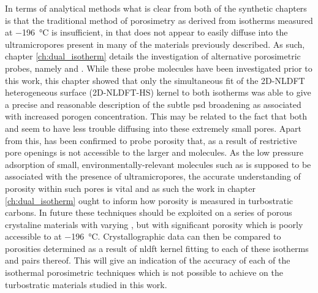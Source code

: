 In terms of analytical methods what is clear from both of the synthetic chapters is that the traditional method of porosimetry as derived from  isotherms measured at \qty{-196}{\degreeCelsius} is insufficient, in that  does not appear to easily diffuse into the \glspl{ultramicropore} present in many of the materials previously described. As such, chapter \ref{ch:dual_isotherm} details the investigation of alternative porosimetric probes, namely  and . While these probe molecules have been investigated prior to this work, this chapter showed that only the simultaneous fit of the 2D-NLDFT heterogeneous surface (2D-NLDFT-HS) kernel to both isotherms was able to give a precise and reasonable description of the subtle \acrshort{psd} broadening as associated with increased \gls{porogen} concentration. This may be related to the fact that both  and  seem to have less trouble diffusing into these extremely small pores. Apart from this,  has been confirmed to probe porosity that, as a result of restrictive pore openings is not accessible to the larger  and  molecules. As the low pressure \gls{adsorption} of small, environmentally-relevant molecules such as  is supposed to be associated with the presence of \glspl{ultramicropore}, the accurate understanding of porosity within such pores is vital and as such the work in chapter \ref{ch:dual_isotherm} ought to inform how porosity is measured in \glspl{turbostratic carbon}. In future these techniques should be exploited on a series of porous crystaline materials with varying , but with significant porosity which is poorly accessible to  at \qty{-196}{\degreeCelsius}. Crystallographic data can then be compared to porosities determined as a result of \acrshort{nldft} kernel fitting to each of these isotherms and pairs thereof. This will give an indication of the accuracy of each of the isothermal porosimetric techniques which is not possible to achieve on the turbostratic materials studied in this work.

